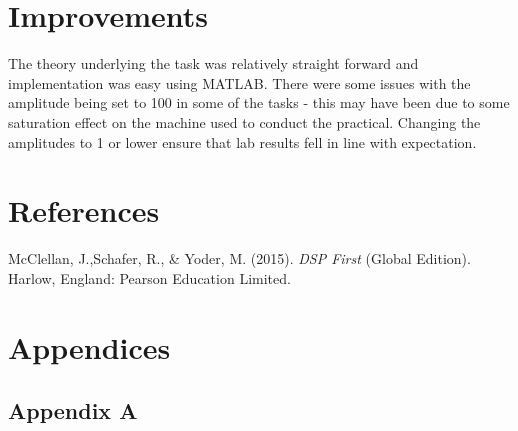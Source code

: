 \documentclass{article}
\begin{document}
\section{Improvements}

The theory underlying the task was relatively straight forward and implementation was easy using MATLAB. There were some issues with the amplitude being set to 100 in some of the tasks - this may have been due to some saturation effect on the machine used to conduct the practical. Changing the amplitudes to 1 or lower ensure that lab results fell in line with expectation. 


\section{References}

McClellan, J.,Schafer, R., \& Yoder, M. (2015). \textit{DSP First} (Global Edition). Harlow, England: Pearson Education Limited.

\newpage

\section{Appendices}

\subsection{Appendix A}
\end{document}
